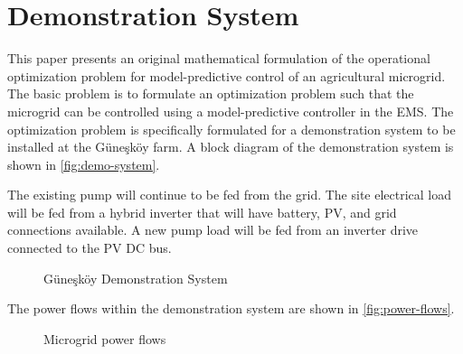 \FloatBarrier

\section{Demonstration System}
\label{sec:demo-system}

This paper presents an original mathematical formulation of the operational optimization problem for model-predictive control of an agricultural microgrid. The basic problem is to formulate an optimization problem such that the microgrid can be controlled using a model-predictive controller in the EMS. The optimization problem is specifically formulated for a demonstration system to be installed at the Güneşköy farm\cite{Guneskoy}. A block diagram of the demonstration system is shown in \autoref{fig:demo-system}.

The existing pump will continue to be fed from the grid. The site electrical load will be fed from a hybrid inverter\cite{INVT_manual} that will have battery, PV, and grid connections available. A new pump load will be fed from an inverter drive\cite{Growatt_manual} connected to the PV DC bus.

\begin{figure}
	\centering
	\fontsize{8pt}{9.5pt}\selectfont
	\def\svgwidth{\columnwidth}
	
	\caption{Güneşköy Demonstration System}
	\label{fig:demo-system}
\end{figure}

The power flows within the demonstration system are shown in \autoref{fig:power-flows}.

\begin{figure}
	\centering
	
	\caption{Microgrid power flows}
	\label{fig:power-flows}
\end{figure}





